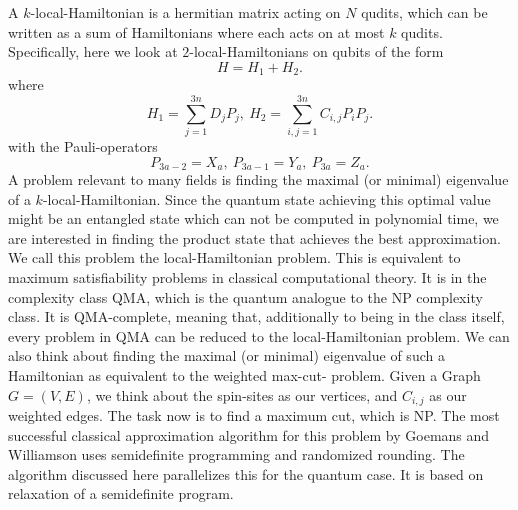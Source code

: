 A $k$-local-Hamiltonian is a hermitian matrix acting on $N$ qudits, which can be written as a sum of Hamiltonians where each acts on at most $k$ qudits.
Specifically, here we look at  $2$-local-Hamiltonians on qubits of the form \[
H = H_1+H_2
.\]
where \[
	H_1 = \sum_{j=1}^{3n} D_jP_j, ~ H_2  = \sum_{i,j=1}^{3n} C_{i,j}P_iP_j
.\]
with the Pauli-operators \[
	P_{3a-2}=X_a, ~ P_{3a-1}=Y_a, ~ P_{3a}=Z_a
.\]
A problem relevant to many fields is finding the maximal (or minimal) eigenvalue of a $k$-local-Hamiltonian.
Since the quantum state achieving this optimal value might be an entangled state which can not be computed in polynomial time, we are interested in finding the product state that achieves the best approximation.
We call this problem the local-Hamiltonian problem.
This is equivalent to maximum satisfiability problems in classical computational theory.
It is in the complexity class QMA, which is the quantum analogue to the NP complexity class.
It is QMA-complete, meaning that, additionally to being in the class itself, every problem in QMA can be reduced to the local-Hamiltonian problem.
We can also think about finding the maximal (or minimal) eigenvalue of such a Hamiltonian as equivalent to the weighted max-cut- problem.
Given a Graph $G=(V,E)$, we think about the spin-sites as our vertices, and $C_{i,j}$ as our weighted edges.
The task now is to find a maximum cut, which is NP.
The most successful classical approximation algorithm for this problem by Goemans and Williamson uses semidefinite programming and randomized rounding.
The algorithm discussed here parallelizes this for the quantum case.
It is based on relaxation of a semidefinite program.
